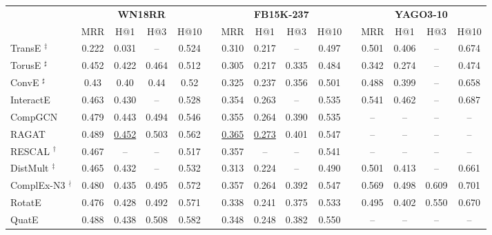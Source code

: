 \documentclass{article}
\theoremstyle{plain}
\theoremstyle{remark}
\begin{document}
\begin{table*}[ht]


	\centering  
	\begin{adjustbox}{max width=\textwidth}
		\begin{tabular}{@{\extracolsep{-4pt}}lcccclcccclcccc}


			& \multicolumn{4}{c}{\textbf{WN18RR}} && \multicolumn{4}{c}{\textbf{FB15K-237}} && \multicolumn{4}{c}{\textbf{YAGO3-10}} \\
			\cmidrule(lr){2-5} \cmidrule(lr){7-10} \cmidrule(lr){12-15}
			& MRR & H@1 & H@3 & H@10 && MRR & H@1 & H@3 & H@10 && MRR & H@1 & H@3 & H@10 \\
			
			\cmidrule(lr){1-5} \cmidrule(lr){7-10} \cmidrule(lr){12-15}
			
TransE \cite{bordes_translatingembeddingsmodeling_2013} $ ^\ddagger $ & 0.222 & 0.031 & -- & 0.524 && 0.310 & 0.217 & -- & 0.497 && 0.501 & 0.406 & -- & 0.674 \\
			TorusE \cite{ebisu_generalizedtranslationbasedembedding_2019} $ ^\sharp $ & 0.452 & 0.422 & 0.464 & 0.512 && 0.305 & 0.217 & 0.335 & 0.484 && 0.342 & 0.274 & -- & 0.474 \\
\cmidrule(lr){1-5} \cmidrule(lr){7-10} \cmidrule(lr){12-15}
			
ConvE \cite{dettmers_convolutional2dknowledge_2018} $ ^\sharp $ & 0.43 & 0.40 & 0.44 & 0.52 && 0.325 & 0.237 & 0.356 & 0.501 && 0.488 & 0.399 & -- & 0.658 \\
			InteractE \cite{vashishth_interacteimprovingconvolutionbased_2020} & 0.463 & 0.430 & -- & 0.528 && 0.354 & 0.263 & -- & 0.535 && 0.541 & 0.462 & -- & 0.687 \\
CompGCN \cite{vashishth_compositionbasedmultirelationalgraph_2020} & 0.479 & 0.443 & 0.494 & 0.546 && 0.355 & 0.264 & 0.390 & 0.535 && -- & -- & -- & -- \\
			RAGAT \cite{liu_ragatrelationaware_2021} & 0.489 & \underline{0.452} & 0.503 & 0.562 && \underline{0.365} & \underline{0.273} & 0.401 & 0.547 && -- & -- & -- & -- \\
			\cmidrule(lr){1-5} \cmidrule(lr){7-10} \cmidrule(lr){12-15}
			
RESCAL \cite{nickel_threewaymodelcollective_2011} $ ^\dagger $ & 0.467 & -- & -- & 0.517 && 0.357 & -- & -- & 0.541 && -- & -- & -- & -- \\
DistMult \cite{yang_embeddingentitiesrelations_2015} $ ^\ddagger $ & 0.465 & 0.432 & -- & 0.532 && 0.313 & 0.224 & -- & 0.490 && 0.501 & 0.413 & -- & 0.661 \\
ComplEx-N3 \cite{trouillon_complexembeddingssimple_2016} $ ^\nmid $ & 0.480 & 0.435 & 0.495 & 0.572 && 0.357 & 0.264 & 0.392 & 0.547 && 0.569 & 0.498 & 0.609 & 0.701 \\
RotatE \cite{sun_rotateknowledgegraph_2019} & 0.476 & 0.428 & 0.492 & 0.571 && 0.338 & 0.241 & 0.375 & 0.533 && 0.495 & 0.402 & 0.550 & 0.670 \\
			QuatE \cite{zhang_quaternionknowledgegraph_2019} & 0.488 & 0.438 & 0.508 & 0.582 && 0.348 & 0.248 & 0.382 & 0.550 && -- & -- & -- & -- \\
			

\end{tabular}
\end{adjustbox}
\end{table*}
\end{document}
